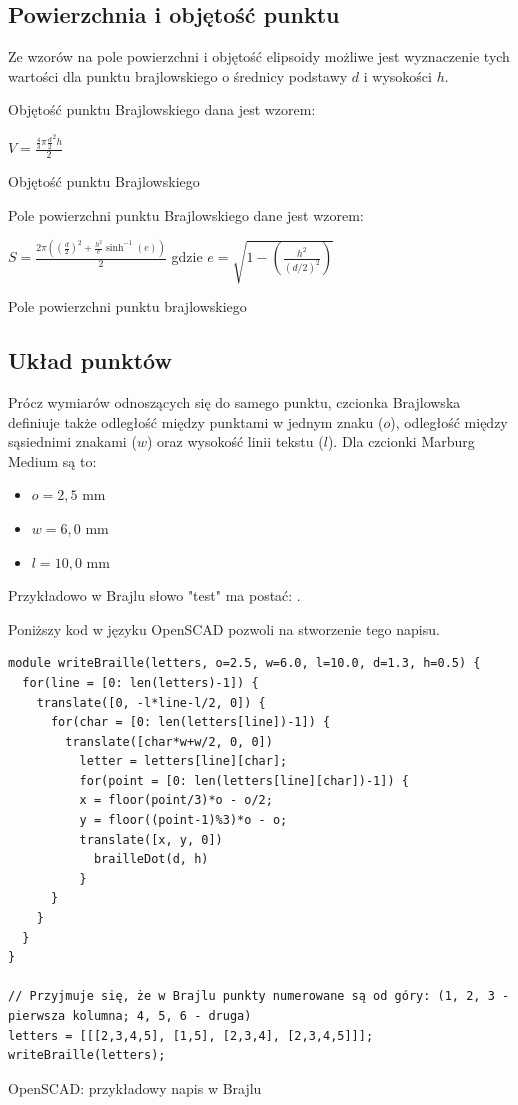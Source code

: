 \documentclass[12pt,a4paper]{article}
\begin{document}
\subsection{Powierzchnia i objętość punktu}
Ze wzorów na pole powierzchni i objętość elipsoidy \cite{ellipsoid} możliwe jest wyznaczenie tych wartości dla punktu brajlowskiego o średnicy podstawy $d$ i wysokości $h$.

Objętość punktu Brajlowskiego dana jest wzorem:
\begin{feq}
$V = \frac{\frac{4}{3}\pi \frac{d}{2}^2h}{2}$
\caption{Objętość punktu Brajlowskiego}
\label{eq:braille_dot_v}
\end{feq}

Pole powierzchni punktu Brajlowskiego dane jest wzorem:
\begin{feq}
$S = \frac{2\pi \left(\left(\frac{d}{2}\right)^2 + \frac{h^2}{e} \sinh^{-1}(e)\right)}{2}$
gdzie
$e = \sqrt{1 - \left(\frac{h^2}{(d/2)^2}\right)}$
\caption{Pole powierzchni punktu brajlowskiego}
\end{feq}

\subsection{Układ punktów}
Prócz wymiarów odnoszących się do samego punktu, czcionka Brajlowska definiuje także odległość między punktami w jednym znaku ($o$), odległość między sąsiednimi znakami ($w$) oraz wysokość linii tekstu ($l$).
Dla czcionki Marburg Medium są to:
\begin{itemize}
\item $o = 2{,}5 \text{ mm}$
\item $w = 6{,}0 \text{ mm}$
\item $l = 10{,}0 \text{ mm}$
\end{itemize}

Przykładowo w Brajlu słowo "test" ma postać: .

Poniższy kod w języku OpenSCAD pozwoli na stworzenie tego napisu.

\begin{code}
\begin{verbatim}
module writeBraille(letters, o=2.5, w=6.0, l=10.0, d=1.3, h=0.5) {
  for(line = [0: len(letters)-1]) {
    translate([0, -l*line-l/2, 0]) {
      for(char = [0: len(letters[line])-1]) {
        translate([char*w+w/2, 0, 0])
          letter = letters[line][char];
          for(point = [0: len(letters[line][char])-1]) {
          x = floor(point/3)*o - o/2;
          y = floor((point-1)%3)*o - o;
          translate([x, y, 0])
            brailleDot(d, h)
          }
      }
    }
  }
}

// Przyjmuje się, że w Brajlu punkty numerowane są od góry: (1, 2, 3 - pierwsza kolumna; 4, 5, 6 - druga)
letters = [[[2,3,4,5], [1,5], [2,3,4], [2,3,4,5]]];
writeBraille(letters);
\end{verbatim}
\caption{OpenSCAD: przykładowy napis w Brajlu}
\end{code}
\end{document}
